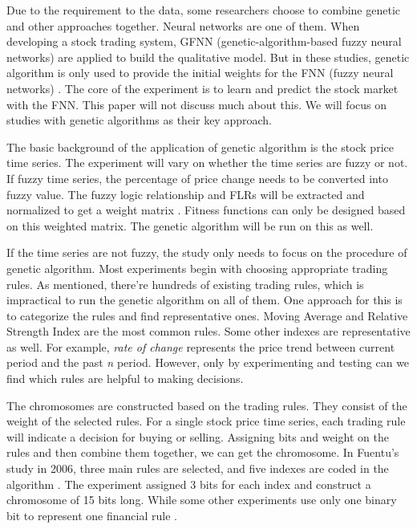 \documentclass{article}
\begin{document}
Due to the requirement to the data, some researchers choose to combine genetic and other approaches together.
Neural networks are one of them.
When developing a stock trading system, GFNN (genetic-algorithm-based fuzzy neural networks)
are applied to build the qualitative model.
But in these studies, genetic algorithm is only used to provide the initial weights
for the FNN (fuzzy neural networks) \cite{an-intelligent-stock-trading-decision-support-system}.
The core of the experiment is to learn and predict the stock market with the FNN.
This paper will not discuss much about this.
We will focus on studies with genetic algorithms as their key approach.

The basic background of the application of genetic algorithm is the stock price time series.
The experiment will vary on whether the time series are fuzzy or not.
If fuzzy time series, the percentage of price change needs to be converted into fuzzy value.
The fuzzy logic relationship and FLRs will be extracted and normalized to get a weight matrix
\cite{a-novel-stock-forecasting-model-based-on-fuzzy-time-series}.
Fitness functions can only be designed based on this weighted matrix.
The genetic algorithm will be run on this as well.

If the time series are not fuzzy, the study only needs to focus on the procedure of genetic algorithm.
Most experiments begin with choosing appropriate trading rules.
As mentioned, there're hundreds of existing trading rules,
which is impractical to run the genetic algorithm on all of them.
One approach for this is to categorize the rules and find representative ones.
Moving Average and Relative Strength Index are the most common rules.
Some other indexes are representative as well.
For example, \emph{rate of change} represents the price trend between current period and the past \emph{n} period.
However, only by experimenting and testing can we find which rules are helpful to making decisions.

The chromosomes are constructed based on the trading rules.
They consist of the weight of the selected rules.
For a single stock price time series, each trading rule will indicate a decision for buying or selling.
Assigning bits and weight on the rules and then combine them together, we can get the chromosome.
In Fuentu's study in 2006, three main rules are selected, and five indexes are coded in the algorithm
\cite{genetic-algorithms-to-optimise-the-time-to-make-stock-market-investment}.
The experiment assigned 3 bits for each index and construct a chromosome of 15 bits long.
While some other experiments use only one binary bit to represent one financial rule
\cite{stock-timing-using-genetic-algorithms}.
\end{document}

